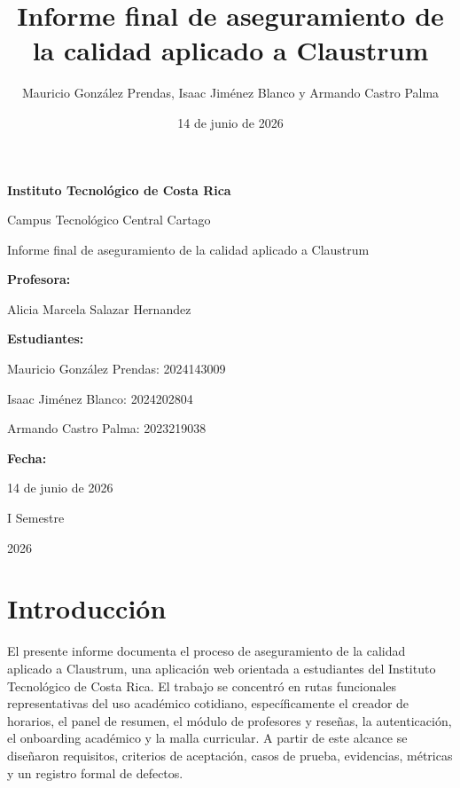 \documentclass[11pt,spanish]{article}
\title{Informe final de aseguramiento de la calidad aplicado a Claustrum}
\author{Mauricio González Prendas, Isaac Jiménez Blanco y Armando Castro Palma}
\date{14 de junio de 2026}
\begin{document}
\hypersetup{pageanchor=false}

\begin{titlepage}
\thispagestyle{empty}
\centering

{\bfseries \huge Instituto Tecnológico de Costa Rica \par}
\vspace{0.25cm}
{\LARGE Campus Tecnológico Central Cartago \par}

\vfill

{\huge Informe final de aseguramiento de la calidad aplicado a Claustrum \par}

\vfill

{\bfseries \LARGE Profesora: \par}
{\Large Alicia Marcela Salazar Hernandez \par}

\vfill

{\bfseries \LARGE Estudiantes: \par}
{\Large Mauricio González Prendas: 2024143009 \par}
{\Large Isaac Jiménez Blanco: 2024202804 \par}
{\Large Armando Castro Palma: 2023219038 \par}

\vfill

{\bfseries\LARGE Fecha: \par}
{\Large 14 de junio de 2026 \par}

\vfill

{\LARGE I Semestre \par}
{\LARGE 2026 \par}

\end{titlepage}

\pagestyle{empty}
\tableofcontents
\clearpage
{}
\hypersetup{pageanchor=true}
\pagestyle{fancy}

\section{Introducción}

El presente informe documenta el proceso de aseguramiento de la calidad aplicado a Claustrum, una aplicación web orientada a estudiantes del Instituto Tecnológico de Costa Rica. El trabajo se concentró en rutas funcionales representativas del uso académico cotidiano, específicamente el creador de horarios, el panel de resumen, el módulo de profesores y reseñas, la autenticación, el onboarding académico y la malla curricular. A partir de este alcance se diseñaron requisitos, criterios de aceptación, casos de prueba, evidencias, métricas y un registro formal de defectos.
\end{document}
